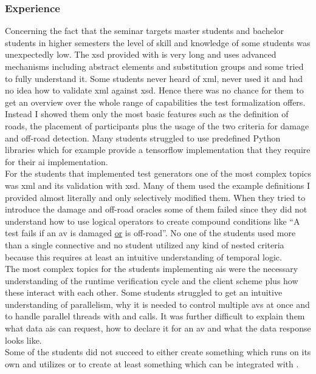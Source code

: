 \subsubsection{Experience}
Concerning the fact that the seminar targets master students and bachelor students in higher semesters the level of skill and knowledge of some students was unexpectedly low.
The \gls{xsd} provided with \drivebuild{} is very long and uses advanced mechanisms including abstract elements and substitution groups and some tried to fully understand it.
Some students never heard of \gls{xml}, never used it and had no idea how to validate \gls{xml} against \gls{xsd}.
Hence there was no chance for them to get an overview over the whole range of capabilities the test formalization offers.
Instead I showed them only the most basic features such as the definition of roads, the placement of participants plus the usage of the two criteria for damage and off-road detection.
Many students struggled to use predefined Python libraries which for example provide a tensorflow implementation that they require for their \gls{ai} implementation.\\
For the students that implemented test generators one of the most complex topics was \gls{xml} and its validation with \gls{xsd}.
Many of them used the example definitions I provided almost literally and only selectively modified them.
When they tried to introduce the damage and off-road oracles some of them failed since they did not understand how to use logical operators to create compound conditions like \enquote{A test fails if an \gls{av} is damaged \underline{or} is off-road}.
No one of the students used more than a single connective and no student utilized any kind of nested criteria because this requires at least an intuitive understanding of temporal logic.\\
The most complex topics for the students implementing \glspl{ai} were the necessary understanding of the runtime verification cycle and the client scheme plus how these interact with each other.
Some students struggled to get an intuitive understanding of parallelism, why it is needed to control multiple \glspl{av} at once and to handle parallel threads with  and  calls.
It was further difficult to explain them what data \glspl{ai} can request, how to declare it for an \gls{av} and what the data response looks like.\\
Some of the students did not succeed to either create something which runs on its own and utilizes \beamng{} or to create at least something which can be integrated with \drivebuild{}.

